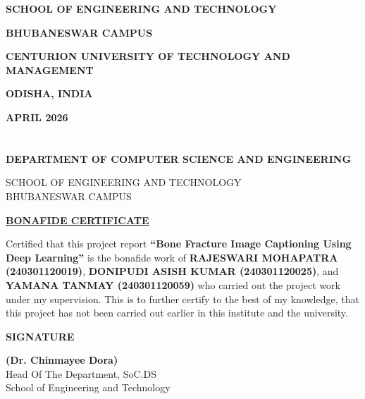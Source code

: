 \documentclass{article}
\begin{document}
\begin{titlepage}
\begin{center}
    {\large \textbf{SCHOOL OF ENGINEERING AND TECHNOLOGY}\par}
    {\large \textbf{BHUBANESWAR CAMPUS}\par}
    {\large \textbf{CENTURION UNIVERSITY OF TECHNOLOGY AND MANAGEMENT}\par}
    {\large \textbf{ODISHA, INDIA}\par}
    \vspace{0.4cm}
    {\large \textbf{APRIL 2026}}
\end{center}
\end{titlepage}

\newpage

\section*{}
\begin{center}
{\huge \textbf{DEPARTMENT OF COMPUTER SCIENCE AND ENGINEERING}}\par\vspace{0.4cm}
\normalsize
\textsc{SCHOOL OF ENGINEERING AND TECHNOLOGY\\
BHUBANESWAR CAMPUS}\par\vspace{1.5cm}

\underline{\LARGE \textbf{BONAFIDE CERTIFICATE}}\par\vspace{1.2cm}
\end{center}

\normalsize Certified that this project report \textbf{``Bone Fracture Image Captioning Using Deep Learning''} is the bonafide work of \textbf{RAJESWARI MOHAPATRA (240301120019)}, \textbf{DONIPUDI ASISH KUMAR (240301120025)}, and \textbf{YAMANA TANMAY (240301120059)} who carried out the project work under my supervision. This is to further certify to the best of my knowledge, that this project has not been carried out earlier in this institute and the university.\par\vspace{1.5cm}

\begin{flushright}
\textbf{SIGNATURE}\par\vspace{1.2cm}
\textbf{(Dr. Chinmayee Dora)}\\
Head Of The Department, SoC.DS\\
School of Engineering and Technology\par\vspace{1.5cm}
\end{flushright}
\end{document}
